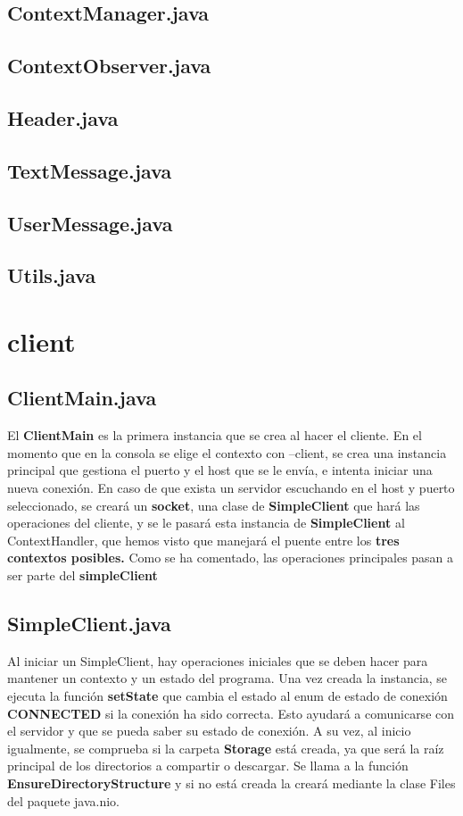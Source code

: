 \documentclass[a4paper, 12pt]{report}
\begin{document}
\section{ContextManager.java}
\section{ContextObserver.java}
\section{Header.java}
\section{TextMessage.java}
\section{UserMessage.java}
\section{Utils.java}

\chapter{client}
\section{ClientMain.java}

El \textbf{ClientMain} es la primera instancia que se crea al hacer el cliente. En el momento que en la consola se elige el contexto con --client, se crea una instancia principal que gestiona el puerto y el host que se le envía, e intenta iniciar una nueva conexión. En caso de que exista un servidor escuchando en el host y puerto seleccionado, se creará un \textbf{socket}, una clase de \textbf{SimpleClient} que hará las operaciones del cliente, y se le pasará esta instancia de \textbf{SimpleClient} al ContextHandler, que hemos visto que manejará el puente entre los \textbf{tres contextos posibles.}
Como se ha comentado, las operaciones principales pasan a ser parte del \textbf{simpleClient}

\section{SimpleClient.java}

Al iniciar un SimpleClient, hay operaciones iniciales que se deben hacer para mantener un contexto y un estado del programa. Una vez creada la instancia, se ejecuta la función \textbf{setState} que cambia el estado al enum de estado de conexión \textbf{CONNECTED} si la conexión ha sido correcta. Esto ayudará a comunicarse con el servidor y que se pueda saber su estado de conexión.
A su vez, al inicio igualmente, se comprueba si la carpeta \textbf{Storage} está creada, ya que será la raíz principal de los directorios a compartir o descargar. Se llama a la función \textbf{EnsureDirectoryStructure} y si no está creada la creará mediante la clase Files del paquete java.nio.
\end{document}
